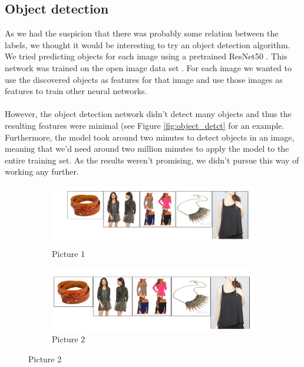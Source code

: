 \documentclass[10pt, a4paper]{article}
\begin{document}
\begin{multicols}{2}
		\subsection{Object detection}
		As we had the suspicion that there was probably some relation between the labels, we thought it would be interesting to try an object detection algorithm. We tried predicting objects for each image using a pretrained ResNet50 \cite{DBLP:journals/corr/HeZRS15}. This network was trained on the open image data set \cite{openimages}. For each image we wanted to use the discovered objects as features for that image and use those images as features to train other neural networks. 
		\\
		\\
		However, the object detection network didn't detect many objects and thus the resulting features were minimal (see Figure \ref{fig:object_detct} for an example. Furthermore, the model took around two minutes to detect objects in an image, meaning that we'd need around two million minutes to apply the model to the entire training set. As the results weren't promising, we didn't pursue this way of working any further.

		
    	\begin{figure}
      \begin{subfigure}[b]{0.4\columnwidth}
        \includegraphics[width=\linewidth]{img/label24_examples.png}
        \caption{Picture 1}
        \label{fig:1}
      \end{subfigure}
      \hfill %
      \begin{subfigure}[b]{0.4\columnwidth}
        \includegraphics[width=\linewidth]{img/label_24.jpg}
        \caption{Picture 2}
        \label{fig:2}
      \end{subfigure}
    \end{figure}
		

\end{multicols}
\end{document}

